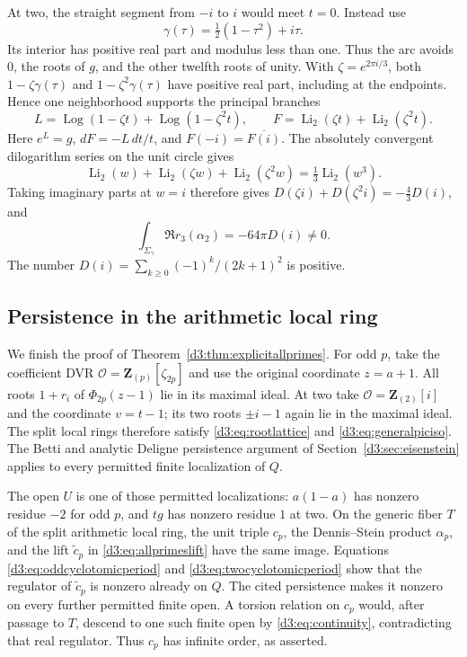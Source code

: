 \documentclass[11pt,a4paper]{amsart}
\numberwithin{equation}{section}
\theoremstyle{definition}
\theoremstyle{remark}
\newcommand{\Z}{\mathbf Z}
\newcommand{\OO}{\mathcal O}
\begin{document}
At two, the straight segment from $-i$ to $i$ would meet $t=0$.
Instead use
\[
 \gamma(\tau)=\tfrac12(1-\tau^2)+i\tau .
\]
Its interior has positive real part and modulus less than one.
Thus the arc avoids $0$, the roots of $g$, and the other twelfth
roots of unity. With $\zeta=e^{2\pi i/3}$, both
$1-\zeta\gamma(\tau)$ and $1-\zeta^2\gamma(\tau)$ have positive
real part, including at the endpoints. Hence one neighborhood
supports the principal branches
\[
 L=\operatorname{Log}(1-\zeta t)+\operatorname{Log}(1-\zeta^2t),
 \qquad
 F=\operatorname{Li}_2(\zeta t)+\operatorname{Li}_2(\zeta^2t).
\]
Here $e^L=g$, $dF=-L\,dt/t$, and
$F(-i)=\overline{F(i)}$.
The absolutely convergent dilogarithm series on the unit circle gives
\[
 \operatorname{Li}_2(w)+\operatorname{Li}_2(\zeta w)
 +\operatorname{Li}_2(\zeta^2w)=\tfrac13\operatorname{Li}_2(w^3).
\]
Taking imaginary parts at $w=i$ therefore gives
$D(\zeta i)+D(\zeta^2i)=-\tfrac43D(i)$, and
\begin{equation}\label{d3:eq:twocyclotomicperiod}
 \int_{\Sigma_\gamma}\Re r_3(\alpha_2)
 =-64\pi D(i)\ne0.
\end{equation}
The number $D(i)=\sum_{k\geq0}(-1)^k/(2k+1)^2$ is positive.

\subsection{Persistence in the arithmetic local ring}

We finish the proof of Theorem~\ref{d3:thm:explicitallprimes}.
For odd $p$, take the coefficient DVR
$\OO=\Z_{(p)}[\zeta_{2p}]$ and use the original coordinate $z=a+1$.
All roots $1+r_i$ of $\Phi_{2p}(z-1)$ lie in its maximal ideal.
At two take $\OO=\Z_{(2)}[i]$ and the coordinate $v=t-1$; its
two roots $\pm i-1$ again lie in the maximal ideal.
The split local rings therefore satisfy \eqref{d3:eq:rootlattice}
and \eqref{d3:eq:generalpiciso}. The Betti and analytic Deligne
persistence argument of Section~\ref{d3:sec:eisenstein} applies to
every permitted finite localization of $Q$.

The open $U$ is one of those permitted localizations:
$a(1-a)$ has nonzero residue $-2$ for odd $p$, and $tg$ has
nonzero residue $1$ at two. On the generic fiber $T$ of the split
arithmetic local ring, the unit triple $c_p$, the Dennis--Stein
product $\alpha_p$, and the lift $\widetilde c_p$ in
\eqref{d3:eq:allprimeslift} have the same image.
Equations \eqref{d3:eq:oddcyclotomicperiod} and
\eqref{d3:eq:twocyclotomicperiod} show that the regulator of
$\widetilde c_p$ is nonzero already on $Q$.
The cited persistence makes it nonzero on every further permitted
finite open. A torsion relation on $c_p$ would, after passage to
$T$, descend to one such finite open by \eqref{d3:eq:continuity},
contradicting that real regulator.
Thus $c_p$ has infinite order, as asserted.
\end{document}
